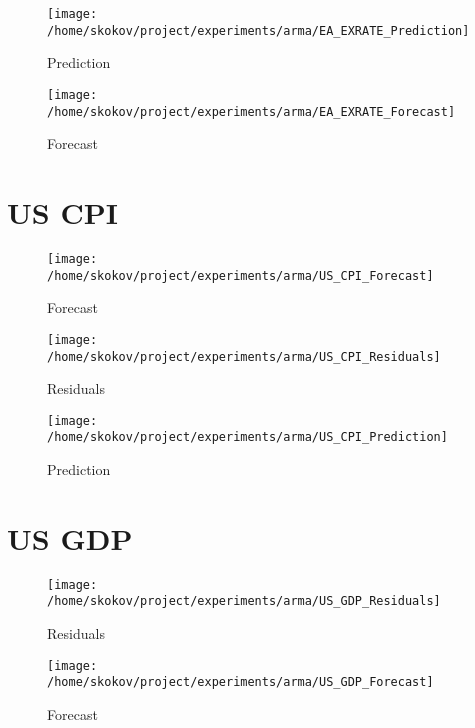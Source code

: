 %


\begin{figure}[h!]%
\centering%
\texttt{[image: /home/skokov/project/experiments/arma/EA\_EXRATE\_Prediction]}%
\caption{Prediction}%
\label{fig:EA_EXRATE_Prediction}%
\end{figure}

%


\begin{figure}[h!]%
\centering%
\texttt{[image: /home/skokov/project/experiments/arma/EA\_EXRATE\_Forecast]}%
\caption{Forecast}%
\label{fig:EA_EXRATE_Forecast}%
\end{figure}

%
\section{US CPI}%


\begin{figure}[h!]%
\centering%
\texttt{[image: /home/skokov/project/experiments/arma/US\_CPI\_Forecast]}%
\caption{Forecast}%
\label{fig:US_CPI_Forecast}%
\end{figure}

%


\begin{figure}[h!]%
\centering%
\texttt{[image: /home/skokov/project/experiments/arma/US\_CPI\_Residuals]}%
\caption{Residuals}%
\label{fig:US_CPI_Residuals}%
\end{figure}

%


\begin{figure}[h!]%
\centering%
\texttt{[image: /home/skokov/project/experiments/arma/US\_CPI\_Prediction]}%
\caption{Prediction}%
\label{fig:US_CPI_Prediction}%
\end{figure}

%
\section{US GDP}%


\begin{figure}[h!]%
\centering%
\texttt{[image: /home/skokov/project/experiments/arma/US\_GDP\_Residuals]}%
\caption{Residuals}%
\label{fig:US_GDP_Residuals}%
\end{figure}

%


\begin{figure}[h!]%
\centering%
\texttt{[image: /home/skokov/project/experiments/arma/US\_GDP\_Forecast]}%
\caption{Forecast}%
\label{fig:US_GDP_Forecast}%
\end{figure}

